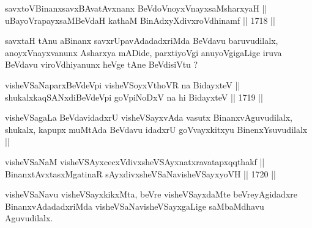
\begin{shl}
\footnotemark[2]savxtoV\s BinanxsavxBAvatAvxnanx BeVdoV\s noyxVnayxsaMsharxyaH || \\
uBayoVrapayxsaMBeVdaH kathaM BinAdxyXdivxroVdhinamf ||  1718 ||  
\end{shl}

\begin{artha}
savxtaH tAnu aBinanx savxrUpavAdadadxriMda BeVdavu baruvudilalx,
anoyxVnayxvanunx Asharxya mADide, parxtiyoVgi anuyoVgigaLige iruva
BeVdavu viroVdhiyanunx heVge tAne BeVdisiVtu ?
\end{artha}


\begin{shl}
visheVSaNaparxBeVdeV\s pi visheVSoyxV\s thoVR na BidayxteV || \\
shukalxkaqSANxdiBeVdeV\s pi goVpiNoDxV na hi BidayxteV ||  1719 ||  
\end{shl}

\begin{artha}
visheVSagaLa BeVdavidadxrU visheVSayxvAda vasutx BinanxvAguvudilalx,
shukalx, kapupx muMtAda BeVdavu idadxrU goVvayxkitxyu BinenxYsuvudilalx ||
\end{artha}


\begin{shl}
\footnotemark[1]visheVSaNaM visheVSAyxcecxVdivxsheVSAyxnatxravatapxqqthakf || \\
BinanxtAvxtasxMgatinaR sAyxdivxsheVSaNavisheVSayxyoVH ||  1720 ||  
\end{shl}

\begin{artha}
visheVSaNavu visheVSayxkikxMta, beVre visheVSayxdaMte
beVreyAgidadxre BinanxvAdadadxriMda visheVSaNavisheVSayxgaLige
saMbaMdhavu Aguvudilalx.
\end{artha}


